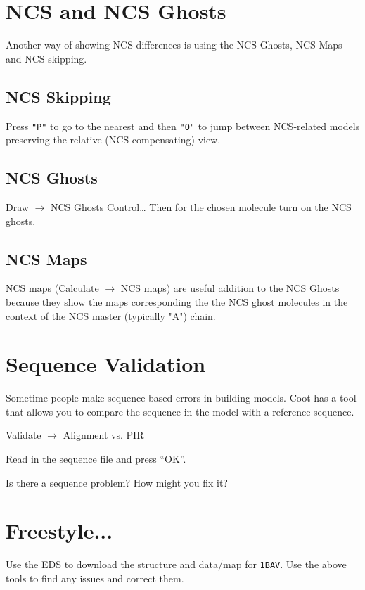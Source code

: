 \documentclass{article}
\begin{document}
\section{NCS and NCS Ghosts}

   Another way of showing NCS differences is using the NCS Ghosts, NCS
   Maps and NCS skipping.  

\subsection{NCS Skipping}

Press \texttt{"P"} to go to the nearest and then \texttt{"O"} to jump
between NCS-related models preserving the relative (NCS-compensating)
view.

\subsection{NCS Ghosts}

\textsf{Draw $\rightarrow$ NCS Ghosts Control\ldots} Then for the
chosen molecule turn on the NCS ghosts.

\subsection{NCS Maps}

NCS maps (\textsf{Calculate $\rightarrow$ NCS maps}) are useful
addition to the NCS Ghosts because they show the maps corresponding
the the NCS ghost molecules in the context of the NCS master
(typically "A") chain.

 
\section{Sequence Validation}

Sometime people make sequence-based errors in building models.  Coot
has a tool that allows you to compare the sequence in the model with a
reference sequence.

\textsf{Validate $\rightarrow$ Alignment vs. PIR}

Read in the sequence file and press ``OK''.

Is there a sequence problem?  How might you fix it?

\section{Freestyle...}

Use the EDS to download the structure and data/map for \texttt{1BAV}.
Use the above tools to find any issues and correct them.
\end{document}
